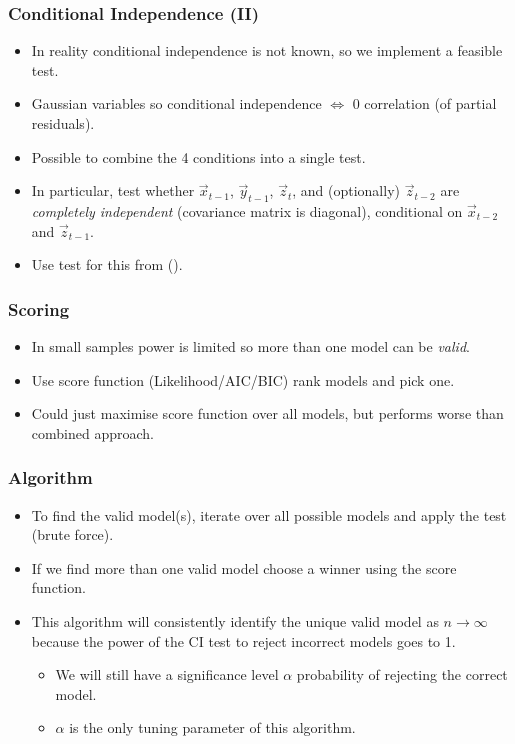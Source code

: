 \documentclass{beamer}
\begin{document}
\begin{frame}
    \frametitle{Conditional Independence (II)}
    \begin{itemize}
        \item In reality conditional independence is not known, so we implement a feasible test.
        \item Gaussian variables so conditional independence $\iff$ 0 correlation (of partial residuals).
        \item Possible to combine the 4 conditions into a single test. 
        \item In particular, test whether $\vec{x}_{t-1}$, $\vec{y}_{t-1}$, $\vec{z}_{t}$, and (optionally) $\vec{z}_{t-2}$ are \textit{completely independent} (covariance matrix is diagonal), conditional on $\vec{x}_{t-2}$ and $\vec{z}_{t-1}$.
        \item Use test for this from \citeauthor{srivastava2005some} (\citeyear{srivastava2005some}).
    \end{itemize}
\end{frame}

\begin{frame}
    \frametitle{Scoring}
    \begin{itemize}
        \item In small samples power is limited so more than one model can be \textit{valid}.
        \item Use score function (Likelihood/AIC/BIC) rank models and pick one.
        \item Could just maximise score function over all models, but performs worse than combined approach.
    \end{itemize}
\end{frame}

\begin{frame}
    \frametitle{Algorithm}
    \begin{itemize}
        \item To find the valid model(s), iterate over all possible models and apply the test (brute force).
        \item If we find more than one valid model choose a winner using the score function.
        \item This algorithm will consistently identify the unique valid model as $n \rightarrow \infty$ because the power of the CI test to reject incorrect models goes to 1.
        \begin{itemize}
            \item We will still have a significance level $\alpha$ probability of rejecting the correct model.
            \item $\alpha$ is the only tuning parameter of this algorithm.
        \end{itemize}
    \end{itemize}
\end{frame}
\end{document}
